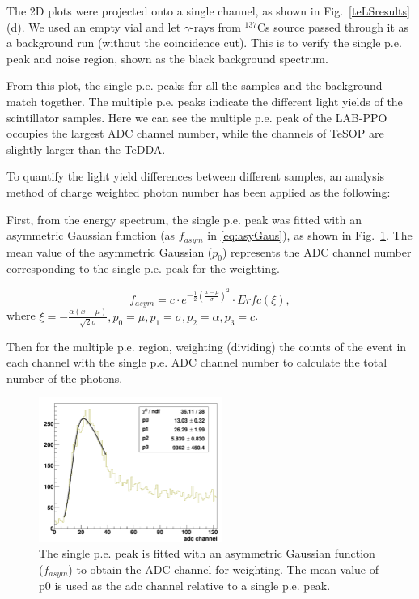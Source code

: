 The 2D plots were projected onto a single channel, as shown in 
Fig.~\ref{teLSresults} (d). We used an empty vial and let $\gamma$-rays from $^{137}$Cs source passed through it as a background run (without the coincidence cut). This is to verify the single p.e. peak and noise region, shown as the black background spectrum.

From this plot, the single p.e. peaks for all the samples and the background match together. The multiple p.e. peaks indicate the different light yields of the scintillator samples. Here we can see the multiple p.e. peak of the LAB-PPO occupies the largest ADC channel number, while the channels of TeSOP are slightly larger than the TeDDA. 

To quantify the light yield differences between different samples, an analysis method of charge weighted photon number has been applied as the following:

First, from the energy spectrum, the single p.e. peak was fitted with an asymmetric Gaussian function (as $f_{asym}$ in \ref{eq:asyGaus}), as shown in Fig.~\ref{fitSinglePE}. The mean value of the asymmetric Gaussian ($p_0$) represents the ADC channel number corresponding to the single p.e. peak for the weighting. 

\begin{equation}\label{eq:asyGaus}
f_{asym}=c\cdot e^{-\frac{1}{2}(\frac{x-\mu}{\sigma})^2}\cdot Erfc(\xi),
\end{equation}
where $\xi=-\frac{\alpha(x-\mu)}{\sqrt 2\sigma},p_0=\mu,p_1=\sigma,p_2=\alpha, p_3=c$.

Then for the multiple p.e. region, weighting (dividing) the counts of the event in each channel with the single p.e. ADC channel number to calculate the total number of the photons.

\begin{figure}[htbp]
	\centering	
	\includegraphics[width=6cm]{fitSinglePE.png}
	\caption[The single p.e. peak fitted with an asymmetric Gaussian function.]{The single p.e. peak is fitted with an asymmetric Gaussian function ($f_{asym}$) to obtain the ADC channel for weighting. The mean value of p0 is used as the adc channel relative to a single p.e. peak.}
	\label{fitSinglePE}
\end{figure}

